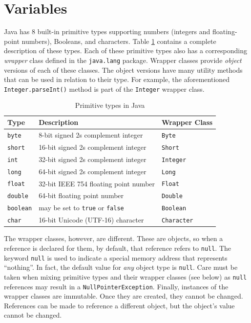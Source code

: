\section{Variables}

Java has 8 built-in \gls{primitive} types supporting numbers (integers 
and floating-point numbers), Booleans, and characters.  Table \ref{table:javaPrimitives}
contains a complete description of these types.  Each of these primitive
types also has a corresponding \emph{wrapper} class defined in the 
\texttt{java.lang} package.  Wrapper classes provide \emph{object}
versions of each of these classes.  The object versions have many utility
methods that can be used in relation to their type.  For example, the
aforementioned \texttt{Integer.parseInt()} method is part of the 
\texttt{Integer} wrapper class.

\begin{table}
\centering
\begin{tabular}{l|l|l}
 Type & Description & Wrapper Class\\
\hline\hline
\texttt{byte} & 8-bit signed 2s complement integer & \texttt{Byte} \\
\texttt{short} & 16-bit signed 2s complement integer  & \texttt{Short} \\
\texttt{int} & 32-bit signed 2s complement integer & \texttt{Integer}  \\
\texttt{long} & 64-bit signed 2s complement integer  & \texttt{Long} \\
\texttt{float} & 32-bit IEEE 754 floating point number & \texttt{Float} \\
\texttt{double} & 64-bit floating point number & \texttt{Double}  \\
\texttt{boolean} & may be set to \texttt{true} or \texttt{false} & \texttt{Boolean} \\
\texttt{char} & 16-bit Unicode (UTF-16) character & \texttt{Character}  \\
\end{tabular}
\caption{Primitive types in Java}
\label{table:javaPrimitives}
\end{table}

The wrapper classes, however, are different.  These are objects, so when a reference is declared
for them, by default, that reference refers to \texttt{null}.  The keyword \texttt{null}
is used to indicate a special memory address that represents ``nothing''.  In fact, the
default value for \emph{any} object type is \texttt{null}.  Care must be taken
when mixing primitive types and their wrapper classes (see below) as \texttt{null}
references may result in a \texttt{NullPointerException}.  Finally, instances
of the wrapper classes are \gls{immutable}.  Once they are created, they cannot be changed.
References can be made to reference a different object, but the object's value cannot
be changed.  

